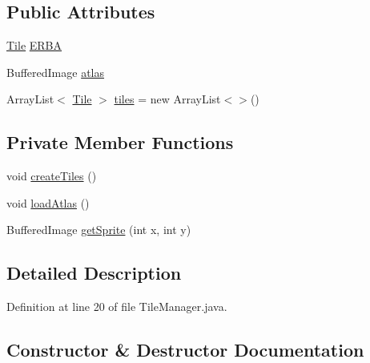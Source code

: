 \subsection*{Public Attributes}
\begin{DoxyCompactItemize}
\item 
\hyperlink{classblocchi_1_1_tile}{Tile} \hyperlink{classblocchi_1_1_tile_manager_a976f8123c1fc10e66de7e7f98570d45a}{E\+R\+BA}
\item 
Buffered\+Image \hyperlink{classblocchi_1_1_tile_manager_a0f6db27994c397bfb9bb56d539707c02}{atlas}
\item 
Array\+List$<$ \hyperlink{classblocchi_1_1_tile}{Tile} $>$ \hyperlink{classblocchi_1_1_tile_manager_a4b6ed1e7aa1fffacfc6271483b48c304}{tiles} = new Array\+List$<$$>$()
\end{DoxyCompactItemize}
\subsection*{Private Member Functions}
\begin{DoxyCompactItemize}
\item 
void \hyperlink{classblocchi_1_1_tile_manager_abb7fa074b36e6e355db16761115fb367}{create\+Tiles} ()
\item 
void \hyperlink{classblocchi_1_1_tile_manager_afc6b9f4a25216ec36baa6e7518a7501a}{load\+Atlas} ()
\item 
Buffered\+Image \hyperlink{classblocchi_1_1_tile_manager_a96613c34a7cfb5341cc3c6a4fe3612a1}{get\+Sprite} (int x, int y)
\end{DoxyCompactItemize}


\subsection{Detailed Description}


Definition at line 20 of file Tile\+Manager.\+java.



\subsection{Constructor \& Destructor Documentation}
\mbox{\label{classblocchi_1_1_tile_manager_a041c1b12a4eb5574dfedf0af6393c014}} 
